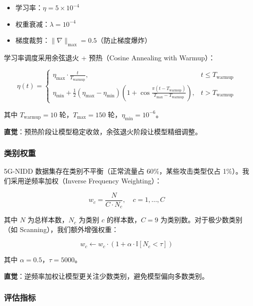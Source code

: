 \begin{itemize}
  \item 学习率：$\eta=5\times10^{-4}$
  \item 权重衰减：$\lambda=10^{-4}$
  \item 梯度裁剪：$\|\nabla\|_{\max}=0.5$（防止梯度爆炸）
\end{itemize}

学习率调度采用余弦退火 + 预热（Cosine Annealing with Warmup）：

\begin{equation}
\eta(t) = \begin{cases}
\eta_{\max} \cdot \frac{t}{T_{\text{warmup}}}, & t \leq T_{\text{warmup}} \\
\eta_{\min} + \frac{1}{2}(\eta_{\max} - \eta_{\min})\left(1 + \cos\frac{\pi(t-T_{\text{warmup}})}{T_{\max}-T_{\text{warmup}}}\right), & t > T_{\text{warmup}}
\end{cases}
\end{equation}

其中 $T_{\text{warmup}}=10$ 轮，$T_{\max}=150$ 轮，$\eta_{\min}=10^{-6}$。

\textbf{直觉}：预热阶段让模型稳定收敛，余弦退火阶段让模型精细调整。

\subsubsection{类别权重}

5G-NIDD 数据集存在类别不平衡（正常流量占 60\%，某些攻击类型仅占 1\%）。我们采用逆频率加权（Inverse Frequency Weighting）：

\begin{equation}
w_c = \frac{N}{C \cdot N_c}, \quad c=1,\ldots,C
\end{equation}

其中 $N$ 为总样本数，$N_c$ 为类别 $c$ 的样本数，$C=9$ 为类别数。对于极少数类别（如 Scanning），我们额外增强权重：

\begin{equation}
w_c \leftarrow w_c \cdot \left(1 + \alpha \cdot \mathbb{I}[N_c < \tau]\right)
\end{equation}

其中 $\alpha=0.5$，$\tau=5000$。

\textbf{直觉}：逆频率加权让模型更关注少数类别，避免模型偏向多数类别。



\subsubsection{评估指标}

